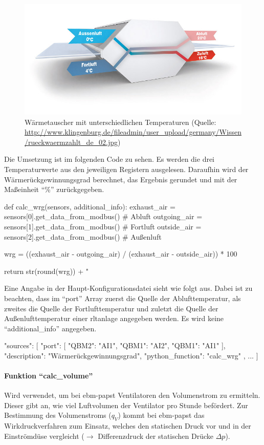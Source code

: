 \begin{figure}[H]
	\centering
	\includegraphics[width=0.7\linewidth]{Bilder/rueckwaermzahl_waermetauscher}
	\caption{Wärmetauscher mit unterschiedlichen Temperaturen (Quelle: \url{http://www.klingenburg.de/fileadmin/user_upload/germany/Wissen/rueckwaermzahlt_de_02.jpg})}
	\label{fig:waermetauscher_wrg}
\end{figure}
 
Die Umsetzung ist im folgenden Code zu sehen. Es werden die drei Temperaturwerte aus den jeweiligen Registern ausgelesen. Daraufhin wird der Wärmerückgewinnungsgrad berechnet, das Ergebnis gerundet und mit der Maßeinheit \enquote{\%} zurückgegeben.

\begin{pythoncode}
def calc_wrg(sensors, additional_info):
	exhaust_air = sensors[0].get_data_from_modbus()  # Abluft
	outgoing_air = sensors[1].get_data_from_modbus()  # Fortluft
	outside_air = sensors[2].get_data_from_modbus()  # Außenluft
	
	wrg = ((exhaust_air - outgoing_air) / (exhaust_air - outside_air)) * 100
	
	return str(round(wrg)) + " %
\end{pythoncode}

Eine Angabe in der Haupt-Konfigurationsdatei sieht wie folgt aus. Dabei ist zu beachten, dass im \enquote{port} Array zuerst die Quelle der Ablufttemperatur, als zweites die Quelle der Fortlufttemperatur und zuletzt die Quelle der Außenlufttemperatur einer \acs{rltanlage} angegeben werden. Es wird keine \enquote{additional\_info} angegeben.

\begin{jsoncode}
	"sources": [
	{
		"port": [
			{"QBM2": "AI1"},
			{"QBM1": "AI2"},
			{"QBM1": "AI1"}
		],
		"description": "Wärmerückgewinnungsgrad",
		"python_function": "calc_wrg"
	},
	...
	]
\end{jsoncode}



\paragraph{Funktion \enquote{calc\_volume}}
Wird verwendet, um bei ebm-papst Ventilatoren den Volumenstrom zu ermitteln. Dieser gibt an, wie viel Luftvolumen der Ventilator pro Stunde befördert. Zur Bestimmung des Volumenstroms ($q_{V}$) kommt bei ebm-papst das Wirkdruckverfahren zum Einsatz, welches den statischen Druck vor und in der Einströmdüse vergleicht ($\rightarrow$ Differenzdruck der statischen Drücke $\Delta p$).

